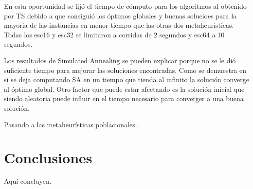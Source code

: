 \documentclass{ci5652}
\begin{document}
En esta oportunidad se fijó el tiempo de cómputo para los algoritmos al obtenido por TS debido a que consiguió los óptimos globales y buenas solucioes para la mayoria de las instancias en menor tiempo que las otras dos metaheurísticas. Todas los esc16 y esc32 se limitaron a corridas de 2 segundos y esc64 a 10 segundos.

Los resultados de Simulated Annealing se pueden explicar porque no se le dió suficiente tiempo para mejorar las soluciones encontradas. Como se demuestra en \cite{7} si se deja computando SA en un tiempo que tienda al infinito la solución converge al óptimo global. Otro factor que puede estar afcetando es la solución inicial que siendo aleatoria puede influir en el tiempo necesario para converger a una buena solución.

Pasando a las metaheurísticas poblacionales...

\section*{Conclusiones}

Aquí concluyen.


\small

\end{document}
